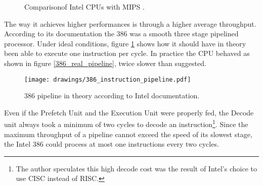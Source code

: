 \par
\begin{figure}[H]
\centering
   \caption{Comparison\protect\footnotemark of Intel CPUs with MIPS \protect\footnotemark.}
 \end{figure}

The way it achieves higher performances is through a higher average throughput. According to its documentation the 386 was a smooth three stage pipelined processor. Under ideal conditions, figure \ref{386_doc_pipeline} shows how it should have in theory been able to execute one instruction per cycle. In practice the CPU behaved as shown in figure \ref{386_real_pipeline}, twice slower than suggested.

\begin{figure}[H]
\centering
\texttt{[image: drawings/386\_instruction\_pipeline.pdf]}
\caption{386 pipeline in theory according to Intel documentation.}
\label{386_doc_pipeline}
\end{figure}



\par
Even if the Prefetch Unit and the Execution Unit were properly fed, the Decode unit always took a minimum of two cycles to decode an instruction\footnote{The author speculates this high decode cost was the result of Intel's choice to use CISC instead of RISC.}. Since the maximum throughput of a pipeline cannot exceed the speed of its slowest stage, the Intel 386 could process at most one instructions every two cycles.\\
\par

